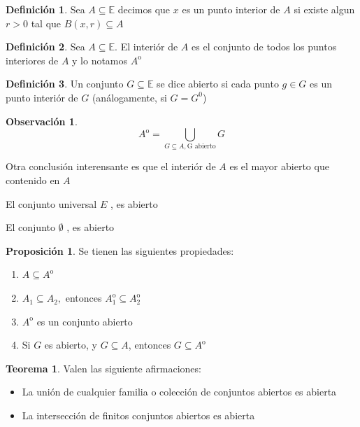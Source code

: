 \documentclass[12pt]{article}
\newcommand{\E}{\mathbb{E}}
\newcommand{\open}{\mathrm{o}}
\theoremstyle{definition}
\newtheorem{definition}{Definición}[section]
\newtheorem*{remark}{Observación}
\newtheorem{theorem}{Teorema}
\newtheorem{prop}{Proposición}
\begin{document}
\begin{definition}
Sea $A \subseteq \E$ decimos que $x$ es un punto interior de $A$ si existe algun $r > 0$ tal que $B(x,r) \subseteq A$ 
\end{definition}


\begin{definition}
  
 Sea $A \subseteq \E.$ El interiór de $A$ es el conjunto de todos los puntos interiores de $A$ y lo notamos $A^{\mathrm{o}}$
\end{definition}

\begin{definition}
  Un conjunto $G \subseteq \E$ se dice abierto si cada punto $g \in G$ es un punto interiór de $G$ (análogamente, si $G = G^{\mathrm{0}}$)  
\end{definition}

\begin{remark}
  $$ A^{\mathrm{o}} = \bigcup_{G \subseteq A ,\text{G abierto}} G$$

\noindent Otra conclusión interensante es que el interiór de $A$ es el mayor abierto que contenido en $A$

\noindent El conjunto universal $E$ , es abierto

\noindent El conjunto $\emptyset$ , es abierto

\begin{prop} Se tienen las siguientes propiedades:
  \begin{enumerate}
    \item $A \subseteq A^{\mathrm{o}}$
    \item $A_{1} \subseteq A_{2},$ entonces $A_{1}^{\mathrm{o}} \subseteq A_{2}^{\mathrm{o}}$
    \item $A^{\open}$ es un conjunto abierto
    \item Si $G$ es abierto, y $G \subseteq A$, entonces $G \subseteq A^{\open}$
  \end{enumerate}
\end{prop}
\end{remark}

\begin{theorem} Valen las siguiente afirmaciones:
  \begin{itemize} 
    \item La unión de cualquier familia o colección de conjuntos abiertos es abierta
    \item La intersección de finitos conjuntos abiertos es abierta
  \end{itemize}
\end{theorem}
\end{document}
